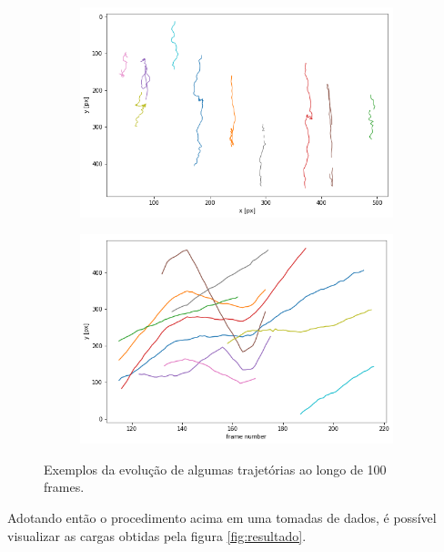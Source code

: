 \documentclass[twoside, twocolumn]{article}
\begin{document}
\begin{figure}[h]
	\centering
    \begin{subfigure}[b]{0.8\linewidth}
    	\includegraphics[width = \linewidth]{traj1}
    \end{subfigure}
        \begin{subfigure}[b]{0.8\linewidth}
    	\includegraphics[width = \linewidth]{traj2}
    \end{subfigure}
    \caption{Exemplos da evolução de algumas trajetórias ao longo de 100 frames.}
    \label{fig:trajetorias}
\end{figure}

Adotando então o procedimento acima em uma tomadas de dados, é possível visualizar as cargas obtidas pela figura \ref{fig:resultado}.
\end{document}
